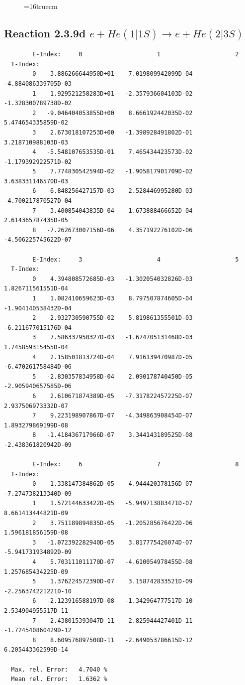 \documentclass[12pt,dvips]{article}
\begin{document}
\begin{figure} \label{2.3.9c}
\epsfxsize=16truecm
\end{figure}
\newpage

\subsection{
Reaction 2.3.9d $ e + He(1|1S) \rightarrow e + He(2|3S) $
}




\begin{small}\begin{verbatim}
        E-Index:     0                     1                     2
  T-Index:
        0   -3.886266644950D+01    7.019809942099D-04   -4.884086339705D-03
        1    1.929521258283D+01   -2.357936604103D-02   -1.328300789738D-02
        2   -9.046404053855D+00    8.666192442035D-02    5.474654335859D-02
        3    2.673018107253D+00   -1.398928491802D-01    3.218710988103D-03
        4   -5.548107653535D-01    7.465434423573D-02   -1.179392922571D-02
        5    7.774830542594D-02   -1.905817901709D-02    3.638331146570D-03
        6   -6.848256427157D-03    2.528446995280D-03   -4.700217870527D-04
        7    3.400854043835D-04   -1.673888466652D-04    2.614365787435D-05
        8   -7.262673007156D-06    4.357192276102D-06   -4.506225745622D-07

        E-Index:     3                     4                     5
  T-Index:
        0    4.394808572685D-03   -1.302054032826D-03    1.826711561551D-04
        1    1.082410659623D-03    8.797507874605D-04   -1.904140538432D-04
        2   -2.932730590755D-02    5.819861355501D-03   -6.211677015176D-04
        3    7.586337950327D-03   -1.674705131468D-03    1.745859315455D-04
        4    2.158501813724D-04    7.916139470987D-05   -6.470261758484D-06
        5   -2.830357834958D-04    2.090178740450D-05   -2.905940657585D-06
        6    2.610671874389D-05   -7.317822457225D-07    2.937506973332D-07
        7    9.223198907867D-07   -4.349863908454D-07    1.893279869199D-08
        8   -1.418436717966D-07    3.344143189525D-08   -2.438361820942D-09

        E-Index:     6                     7                     8
  T-Index:
        0   -1.338147384862D-05    4.944420378156D-07   -7.274738213340D-09
        1    1.572144633422D-05   -5.949713883471D-07    8.661413444821D-09
        2    3.751189894835D-05   -1.205285676422D-06    1.596181856159D-08
        3   -1.072392282940D-05    3.817775426074D-07   -5.941731934892D-09
        4    5.703111011170D-07   -4.610054978455D-08    1.257685434225D-09
        5    1.376224572390D-07    3.158742833521D-09   -2.256374221221D-10
        6   -2.123916588197D-08   -1.342964777517D-10    2.534904955517D-11
        7    2.438015393047D-11    2.825944427401D-11   -1.724540860429D-12
        8    8.609576897508D-11   -2.649053786615D-12    6.205443362599D-14

  Max. rel. Error:   4.7040 %
  Mean rel. Error:   1.6362 %



\end{verbatim}\end{small}
\end{document}
